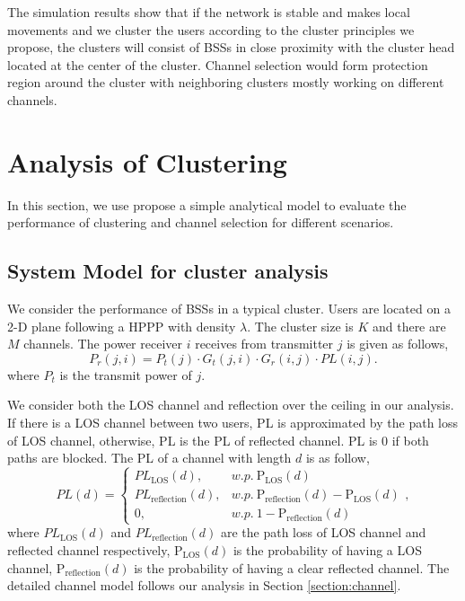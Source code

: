 \documentclass[10pt, conference, letterpaper]{IEEEtran}
\DeclareMathOperator*{\LOS}{\mathrm{LOS}}
\begin{document}
The simulation results show that if the network is stable and makes local movements and we cluster the users according to the cluster principles we propose, the clusters will consist of BSSs in close proximity with the cluster head located at the center of the cluster. Channel selection would form protection region around the cluster with neighboring clusters mostly working on different channels.

\section{Analysis of Clustering}\label{section:clusteranalysis}
In this section, we use propose a simple analytical model to evaluate the performance of clustering and channel selection for different scenarios.

\subsection{System Model for cluster analysis}
We consider the performance of BSSs in a typical cluster. Users are located on a 2-D plane following a HPPP with density $\lambda$. The cluster size is $K$ and there are $M$ channels. 
The power receiver $i$ receives from transmitter $j$ is given as follows, 
\begin{equation*}
P_r(j,i) = P_t(j)\cdot G_t(j,i) \cdot G_r(i,j) \cdot PL(i,j).
\end{equation*} 
where $P_t$ is the transmit power of $j$.

We consider both the LOS channel and reflection over the ceiling in our analysis. If there is a LOS channel between two users, PL is approximated by the path loss of LOS channel, otherwise, PL is the PL of reflected channel. PL is 0 if both paths are blocked.
The PL of a channel with length $d$ is as follow, 
\begin{equation*}
PL(d) = 
\begin{cases}
PL_{\LOS}(d), & w.p. ~ \mathrm{P_{LOS}}(d)\\
PL_{\mathrm{reflection}}(d), & w.p. ~ \mathrm{P_{reflection}}(d) - \mathrm{P_{LOS}}(d) \\
0, & w.p. ~ 1-\mathrm{P_{reflection}}(d)
\end{cases},
\end{equation*}
where $PL_{\LOS}(d)$ and $PL_{\mathrm{reflection}}(d)$ are the path loss of LOS channel and reflected channel respectively, $\mathrm{P_{LOS}}(d)$ is the probability of having a LOS channel, $\mathrm{P_{reflection}}(d)$ is the probability of having a clear reflected channel. The detailed channel model follows our analysis in Section \ref{section:channel}. 
\end{document}

